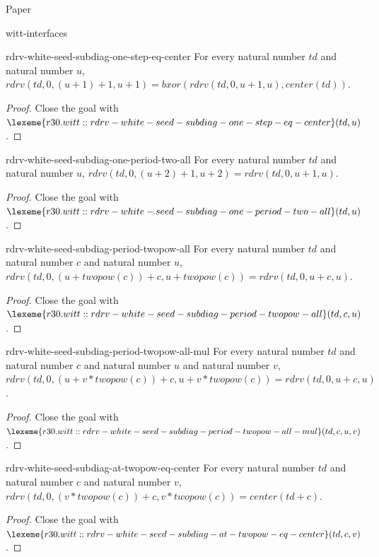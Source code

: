 \begin{lexlean}{Paper}
\begin{section}{witt-interfaces}
  \begin{theorem}{rdrv-white-seed-subdiag-one-step-eq-center}
  For every natural number \(td\) and natural number \(u\), \(rdrv(td, 0, (u + 1) + 1, u + 1) = bxor(rdrv(td, 0, u + 1, u), center(td))\).
  \begin{proof}
  Close the goal with \(\lexeme{r30.witt::rdrv-white-seed-subdiag-one-step-eq-center}(td, u)\).
  \end{proof}
  \end{theorem}

  \begin{theorem}{rdrv-white-seed-subdiag-one-period-two-all}
  For every natural number \(td\) and natural number \(u\), \(rdrv(td, 0, (u + 2) + 1, u + 2) = rdrv(td, 0, u + 1, u)\).
  \begin{proof}
  Close the goal with \(\lexeme{r30.witt::rdrv-white-seed-subdiag-one-period-two-all}(td, u)\).
  \end{proof}
  \end{theorem}

  \begin{theorem}{rdrv-white-seed-subdiag-period-twopow-all}
  For every natural number \(td\) and natural number \(c\) and natural number \(u\), \(rdrv(td, 0, (u + twopow(c)) + c, u + twopow(c)) = rdrv(td, 0, u + c, u)\).
  \begin{proof}
  Close the goal with \(\lexeme{r30.witt::rdrv-white-seed-subdiag-period-twopow-all}(td, c, u)\).
  \end{proof}
  \end{theorem}

  \begin{theorem}{rdrv-white-seed-subdiag-period-twopow-all-mul}
  For every natural number \(td\) and natural number \(c\) and natural number \(u\) and natural number \(v\), \(rdrv(td, 0, (u + v * twopow(c)) + c, u + v * twopow(c)) = rdrv(td, 0, u + c, u)\).
  \begin{proof}
  Close the goal with \(\lexeme{r30.witt::rdrv-white-seed-subdiag-period-twopow-all-mul}(td, c, u, v)\).
  \end{proof}
  \end{theorem}

  \begin{theorem}{rdrv-white-seed-subdiag-at-twopow-eq-center}
  For every natural number \(td\) and natural number \(c\) and natural number \(v\), \(rdrv(td, 0, (v * twopow(c)) + c, v * twopow(c)) = center(td + c)\).
  \begin{proof}
  Close the goal with \(\lexeme{r30.witt::rdrv-white-seed-subdiag-at-twopow-eq-center}(td, c, v)\).
  \end{proof}
  \end{theorem}


\end{section}
\end{lexlean}
